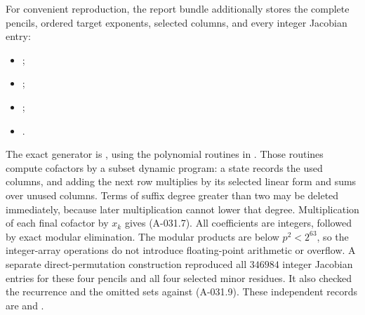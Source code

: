 For convenient reproduction, the report bundle additionally stores
the complete pencils, ordered target exponents, selected columns,
and every integer Jacobian entry:
\begin{itemize}
\item {};
\item {};
\item {};
\item {}.
\end{itemize}
The exact generator is
,
using the polynomial routines in
.
Those routines compute cofactors by a subset dynamic program:
a state records the used columns, and adding the next row
multiplies by its selected linear form and sums over unused columns.
Terms of suffix degree greater than two may be deleted immediately,
because later multiplication cannot lower that degree.
Multiplication of each final cofactor by \(x_k\) gives (A-031.7).
All coefficients are integers, followed by exact modular elimination.
The modular products are below \(p^2<2^{63}\), so the
integer-array operations do not introduce floating-point arithmetic
or overflow. A separate direct-permutation construction reproduced
all \(346984\) integer Jacobian entries for these four pencils and
all four selected minor residues. It also checked the recurrence
and the omitted sets against (A-031.9). These independent records are
and .

